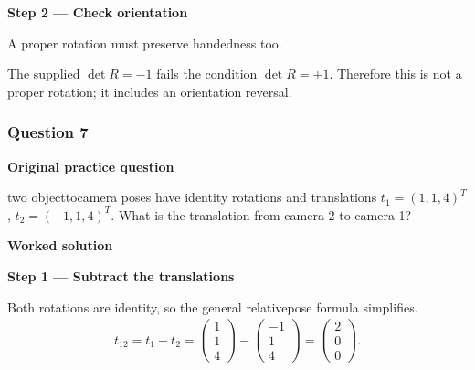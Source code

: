 \documentclass[letterpaper,11pt,english,openany,oneside]{jupyterBook}
\begin{document}
\par

\par\medskip{}
{\color{QuizStepRed}\bfseries Step 2 — Check orientation}\par\smallskip

\sphinxAtStartPar
{} A proper rotation must preserve handedness too.

\sphinxAtStartPar
The supplied {\color{QuizMathBlue} \(\det R=-1\)} fails the condition {\color{QuizMathBlue} \(\det R=+1\)}. Therefore this is not a proper rotation; it includes an orientation reversal.

\par

\par\medskip


\subsubsection{Question 7}
\label{\detokenize{lectures/lecture01/tldr:question-7}}\label{\detokenize{lectures/lecture01/tldr:lec01-tldr-q7}}
\par\medskip\textbf{Original practice question}\par\smallskip

\sphinxAtStartPar
{} two object\sphinxhyphen{}to\sphinxhyphen{}camera poses have identity rotations and translations \(t_1=(1,1,4)^T\), \(t_2=(-1,1,4)^T\). What is the translation from camera 2 to camera 1?

\par\medskip

\par\medskip
\textbf{Worked solution}\par\smallskip

\par\medskip{}
{\color{QuizStepRed}\bfseries Step 1 — Subtract the translations}\par\smallskip

\sphinxAtStartPar
{} Both rotations are identity, so the general relative\sphinxhyphen{}pose formula simplifies.
{\color{QuizMathBlue} \begin{equation*}
\begin{split}
t_{12}=t_1-t_2=\begin{pmatrix}1\\1\\4\end{pmatrix}-\begin{pmatrix}-1\\1\\4\end{pmatrix}=\begin{pmatrix}2\\0\\0\end{pmatrix}.
\end{split}
\end{equation*}}
\par
\end{document}
